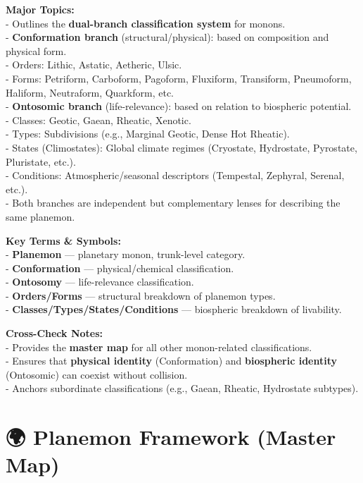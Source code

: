 \documentclass[
  letterpaper,
]{book}
\begin{document}
\textbf{Major Topics:}\\
- Outlines the \textbf{dual-branch classification system} for monons.\\
- \textbf{Conformation branch} (structural/physical): based on
composition and physical form.\\
- Orders: Lithic, Astatic, Aetheric, Ulsic.\\
- Forms: Petriform, Carboform, Pagoform, Fluxiform, Transiform,
Pneumoform, Haliform, Neutraform, Quarkform, etc.\\
- \textbf{Ontosomic branch} (life-relevance): based on relation to
biospheric potential.\\
- Classes: Geotic, Gaean, Rheatic, Xenotic.\\
- Types: Subdivisions (e.g., Marginal Geotic, Dense Hot Rheatic).\\
- States (Climostates): Global climate regimes (Cryostate, Hydrostate,
Pyrostate, Pluristate, etc.).\\
- Conditions: Atmospheric/seasonal descriptors (Tempestal, Zephyral,
Serenal, etc.).\\
- Both branches are independent but complementary lenses for describing
the same planemon.

\textbf{Key Terms \& Symbols:}\\
- \textbf{Planemon} --- planetary monon, trunk-level category.\\
- \textbf{Conformation} --- physical/chemical classification.\\
- \textbf{Ontosomy} --- life-relevance classification.\\
- \textbf{Orders/Forms} --- structural breakdown of planemon types.\\
- \textbf{Classes/Types/States/Conditions} --- biospheric breakdown of
livability.

\textbf{Cross-Check Notes:}\\
- Provides the \textbf{master map} for all other monon-related
classifications.\\
- Ensures that \textbf{physical identity} (Conformation) and
\textbf{biospheric identity} (Ontosomic) can coexist without
collision.\\
- Anchors subordinate classifications (e.g., Gaean, Rheatic, Hydrostate
subtypes).

\chapter{🌍 Planemon Framework (Master
Map)}\label{planemon-framework-master-map}
\end{document}
